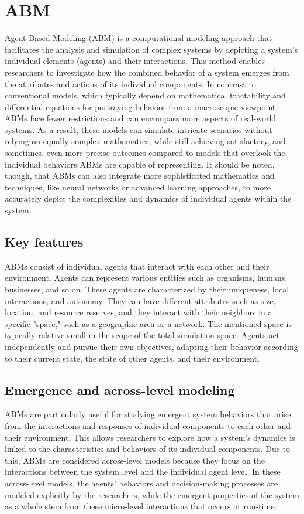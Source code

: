 \section{ABM}
    Agent-Based Modeling (ABM) is a computational modeling approach that facilitates the analysis and simulation of complex systems by depicting a system's individual elements (agents) and their interactions\cite{railsback2019agent}. This method enables researchers to investigate how the combined behavior of a system emerges from the attributes and actions of its individual components. In contrast to conventional models, which typically depend on mathematical tractability and differential equations for portraying behavior from a macroscopic viewpoint, ABMs face fewer restrictions and can encompass more aspects of real-world systems\cite{bonabeau2002agent}. As a result, these models can simulate intricate scenarios without relying on equally complex mathematics, while still achieving satisfactory, and sometimes, even more precise outcomes compared to models that overlook the individual behaviors ABMs are capable of representing. It should be noted, though, that ABMs can also integrate more sophisticated mathematics and techniques, like neural networks or advanced learning approaches, to more accurately depict the complexities and dynamics of individual agents within the system.

\subsection{Key features}
    ABMs consist of individual agents that interact with each other and their environment. Agents can represent various entities such as organisms, humans, businesses, and so on. These agents are characterized by their uniqueness, local interactions, and autonomy. They can have different attributes such as size, location, and resource reserves, and they interact with their neighbors in a specific "space," such as a geographic area or a network\cite{railsback2019agent}. The mentioned space is typically relative small in the scope of the total simulation space. Agents act independently and pursue their own objectives, adapting their behavior according to their current state, the state of other agents, and their environment.

\subsection{Emergence and across-level modeling}
    ABMs are particularly useful for studying emergent system behaviors that arise from the interactions and responses of individual components to each other and their environment. This allows researchers to explore how a system's dynamics is linked to the characteristics and behaviors of its individual components. Due to this, ABMs are considered across-level models because they focus on the interactions between the system level and the individual agent level\cite{railsback2019agent}. In these across-level models, the agents' behaviors and decision-making processes are modeled explicitly by the researchers, while the emergent properties of the system as a whole stem from these micro-level interactions that occurs at run-time.


